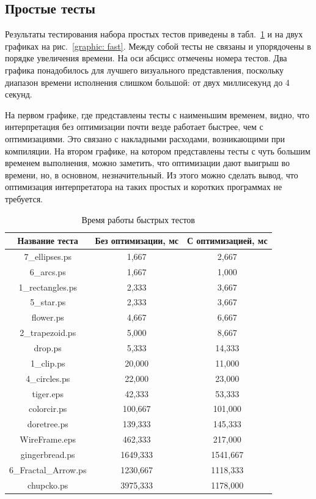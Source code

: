 	\subsection*{Простые тесты}
	Результаты тестирования набора простых тестов приведены в табл.~\ref{tab:fast-tests} и на двух графиках на рис.~\ref{graphic: fast}. Между собой тесты не связаны и упорядочены в порядке увеличения времени. На оси абсцисс отмечены номера тестов. Два графика понадобилось для лучшего визуального представления, поскольку диапазон времени исполнения слишком большой: от двух миллисекунд до 4 секунд.
	
	На первом графике, где представлены тесты с наименьшим временем, видно, что интерпретация без оптимизации почти везде работает быстрее, чем с оптимизациями. Это связано с накладными расходами, возникающими при компиляции. На втором графике, на котором представлены тесты с чуть большим временем выполнения, можно заметить, что оптимизации дают выигрыш во времени, но, в основном, незначительный. Из этого можно сделать вывод, что оптимизация интерпретатора на таких простых и коротких программах не требуется.\\



\begin{table}[H]
	\small
	\begin{center}
	\begin{tabular}{|c|c|c|}
		\hline \textbf{Название теста} & \textbf{Без оптимизации, мс} & \textbf{С оптимизацией, мс}\\
		\hline 7\_ellipses.ps & 1,667 &  2,667\\
		\hline 6\_arcs.ps & 1,667 & 1,000\\
		\hline 1\_rectangles.ps & 2,333 & 3,667\\
		\hline 5\_star.ps &  2,333 & 3,667\\
		\hline flower.ps & 4,667 & 6,667\\
		\hline 2\_trapezoid.ps & 5,000 & 8,667\\
		\hline drop.ps & 5,333 & 14,333\\
		\hline 1\_clip.ps & 20,000 & 11,000\\
		\hline 4\_circles.ps & 22,000 & 23,000\\
		\hline tiger.eps & 42,333 & 53,333\\
		\hline colorcir.ps & 100,667 & 101,000\\
		\hline doretree.ps & 139,333 & 145,333\\
		\hline WireFrame.eps &  462,333 &  217,000\\
		\hline gingerbread.ps & 1649,333 & 1541,667\\
		\hline 6\_Fractal\_Arrow.ps &  1230,667 & 1118,333\\
		\hline chupcko.ps & 3975,333 &  1178,000\\
		\hline 					
	\end{tabular}
	\end{center}
	\caption{\label{tab:fast-tests}Время работы быстрых тестов}
\end{table}


